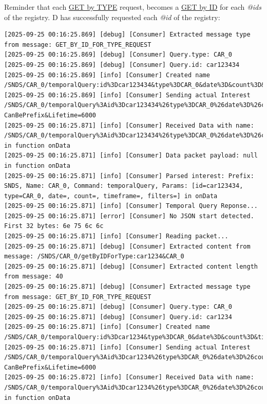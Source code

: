\documentclass{article}
\begin{document}
Reminder that each \hyperref[get_by_type_section]{GET by TYPE} request, becomes a \hyperref[get_by_id_section]{GET by ID} for each \textit{@ids} of the registry. D has successfully requested each \textit{@id} of the registry: 

\begin{lstlisting}[language=log, caption={D's log after receiving the registry payload, which are the \textit{@ids}, and performing a \emph{GET by ID} for each},label={lst:get-by-id-after-get-by-type-d}]
[2025-09-25 00:16:25.869] [debug] [Consumer] Extracted message type from message: GET_BY_ID_FOR_TYPE_REQUEST
[2025-09-25 00:16:25.869] [debug] [Consumer] Query.type: CAR_0
[2025-09-25 00:16:25.869] [debug] [Consumer] Query.id: car123434
[2025-09-25 00:16:25.869] [info] [Consumer] Created name /SNDS/CAR_0/temporalQuery:id%3Dcar123434&type%3DCAR_0&date%3D&count%3D&timeframe%3D&filters%3D
[2025-09-25 00:16:25.869] [info] [Consumer] Sending actual Interest /SNDS/CAR_0/temporalQuery%3Aid%3Dcar123434%26type%3DCAR_0%26date%3D%26count%3D%26timeframe%3D%26filters%3D?CanBePrefix&Lifetime=6000
[2025-09-25 00:16:25.871] [info] [Consumer] Received Data with name: /SNDS/CAR_0/temporalQuery%3Aid%3Dcar123434%26type%3DCAR_0%26date%3D%26count%3D%26timeframe%3D%26filters%3D in function onData
[2025-09-25 00:16:25.871] [info] [Consumer] Data packet payload: null in function onData
[2025-09-25 00:16:25.871] [info] [Consumer] Parsed interest: Prefix: SNDS, Name: CAR_0, Command: temporalQuery, Params: [id=car123434, type=CAR_0, date=, count=, timeframe=, filters=] in onData
[2025-09-25 00:16:25.871] [info] [Consumer] Temporal Query Reponse...
[2025-09-25 00:16:25.871] [error] [Consumer] No JSON start detected. First 32 bytes: 6e 75 6c 6c 
[2025-09-25 00:16:25.871] [info] [Consumer] Reading packet...
[2025-09-25 00:16:25.871] [debug] [Consumer] Extracted content from message: /SNDS/CAR_0/getByIDForType:car1234&CAR_0
[2025-09-25 00:16:25.871] [debug] [Consumer] Extracted content length from message: 40
[2025-09-25 00:16:25.871] [debug] [Consumer] Extracted message type from message: GET_BY_ID_FOR_TYPE_REQUEST
[2025-09-25 00:16:25.871] [debug] [Consumer] Query.type: CAR_0
[2025-09-25 00:16:25.871] [debug] [Consumer] Query.id: car1234
[2025-09-25 00:16:25.871] [info] [Consumer] Created name /SNDS/CAR_0/temporalQuery:id%3Dcar1234&type%3DCAR_0&date%3D&count%3D&timeframe%3D&filters%3D
[2025-09-25 00:16:25.871] [info] [Consumer] Sending actual Interest /SNDS/CAR_0/temporalQuery%3Aid%3Dcar1234%26type%3DCAR_0%26date%3D%26count%3D%26timeframe%3D%26filters%3D?CanBePrefix&Lifetime=6000
[2025-09-25 00:16:25.872] [info] [Consumer] Received Data with name: /SNDS/CAR_0/temporalQuery%3Aid%3Dcar1234%26type%3DCAR_0%26date%3D%26count%3D%26timeframe%3D%26filters%3D in function onData

\end{lstlisting}
\end{document}
